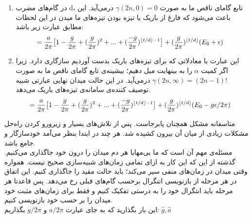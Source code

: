 \begin{enumerate}
	\item 
	در گام‌های مضرب d، تابع گامای ناقص ما به صورت 
	$ \gamma(2n,0) = 0 $
	درمی‌آید. این باعث می‌شود که فارغ از باریک یا تیزه بودن تیزه‌های ما میدن در این لحظات مطابق 		عبارت زیر باشد:
	\begin{align}
		&= \frac{a}{2\pi} \big[ 1 - \frac{g}{2\pi} + (\frac{g}{2\pi})^2 + ... + (\frac{-g}{2\pi})^{\left\lfloor t/d \right\rfloor - 1} \big] + (\frac{g}{2\pi})^{\left\lfloor t/d \right\rfloor} (E_0 + \epsilon)
	\end{align}
	
	\item 
	این عبارت با معادلاتی که برای تیزه‌های باریک بدست آوردیم سازگاری دارد. زیرا اگر کمیت
	$\alpha$
	را به بینهایت میل دهیم؛ بیشینه‌ی تابع گامای ناقص ما به صورت 
	$ \gamma(2n,\infty) = (2n-1)! $
	درمی‌آید. در این حالت میدان نهایی عبارتی شبیه توصیف ‌کننده‌ی سامانه‌ی تیزه‌های باریک می‌دهد.
	\begin{align}
		&= \frac{a}{2\pi} \big[ 1 - \frac{g}{2\pi} + (\frac{g}{2\pi})^2 + ... + (\frac{-g}{2\pi})^{\left\lfloor t/d \right\rfloor - 1} \big] + (\frac{g}{2\pi})^{\left\lfloor t/d \right\rfloor} (E_0 - g\epsilon/2\pi)
	\end{align}
	
\end{enumerate}


متاسفانه مشکل همچنان پابرجاست. پس از تلاش‌های بسیار و زیرورو کردن راه‌حل مشکلات زیادی از میان آن بیرون کشیده شد. هر چند در ابتدا بنظر می‌آمد خودسازگار و جامع باشد.\\
مسئله‌ی مهم آن است که ما بی‌مهابا هر دم میدان را درون خود جاگذاری می‌کنیم. گذشته از این که این کار به ازای تمامی زمان‌های شبیه‌سازی صحیح نیست. همواره وقتی میدان در زمان‌های منفی سیر می‌کند؛ باید حالت مقید را جاگذاری کنیم. این اتفاق در هر مرحله از بازنویسی انتگرال برحسب گام‌های قبلی رخ می‌دهد. پس قاعدتا هر مرحله باید انتگرال خود را به درستی تفکیک کنیم و فقط برای زمان‌های مثبت خود میدان را بر حسب خود بازنویسی کنیم.\\
این بار بگذارید که به جای عبارت
$a/2\pi$
و
$g/2\pi$
بگذاریم:
$\hat{g}, \hat{a}$


